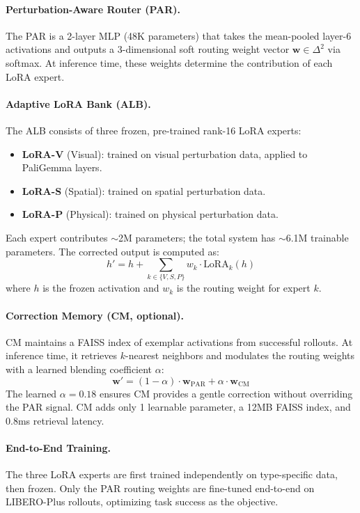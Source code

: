 \documentclass[conference]{article}
\newcommand{\liberoplus}{LIBERO-Plus}
\begin{document}
\paragraph{Perturbation-Aware Router (PAR).}
The PAR is a 2-layer MLP (48K parameters) that takes the mean-pooled layer-6 activations and outputs a 3-dimensional soft routing weight vector $\mathbf{w} \in \Delta^2$ via softmax.
At inference time, these weights determine the contribution of each LoRA expert.

\paragraph{Adaptive LoRA Bank (ALB).}
The ALB consists of three frozen, pre-trained rank-16 LoRA experts:
\begin{itemize}
  \item \textbf{LoRA-V} (Visual): trained on visual perturbation data, applied to PaliGemma layers.
  \item \textbf{LoRA-S} (Spatial): trained on spatial perturbation data.
  \item \textbf{LoRA-P} (Physical): trained on physical perturbation data.
\end{itemize}
Each expert contributes $\sim$2M parameters; the total system has $\sim$6.1M trainable parameters.
The corrected output is computed as:
\begin{equation}
  h' = h + \sum_{k \in \{V,S,P\}} w_k \cdot \text{LoRA}_k(h)
\end{equation}
where $h$ is the frozen activation and $w_k$ is the routing weight for expert $k$.

\paragraph{Correction Memory (CM, optional).}
CM maintains a FAISS index of exemplar activations from successful rollouts. At inference time, it retrieves $k$-nearest neighbors and modulates the routing weights with a learned blending coefficient $\alpha$:
\begin{equation}
  \mathbf{w}' = (1 - \alpha) \cdot \mathbf{w}_{\text{PAR}} + \alpha \cdot \mathbf{w}_{\text{CM}}
\end{equation}
The learned $\alpha=0.18$ ensures CM provides a gentle correction without overriding the PAR signal.
CM adds only 1 learnable parameter, a 12MB FAISS index, and 0.8ms retrieval latency.

\paragraph{End-to-End Training.}
The three LoRA experts are first trained independently on type-specific data, then frozen.
Only the PAR routing weights are fine-tuned end-to-end on \liberoplus{} rollouts, optimizing task success as the objective.
\end{document}
